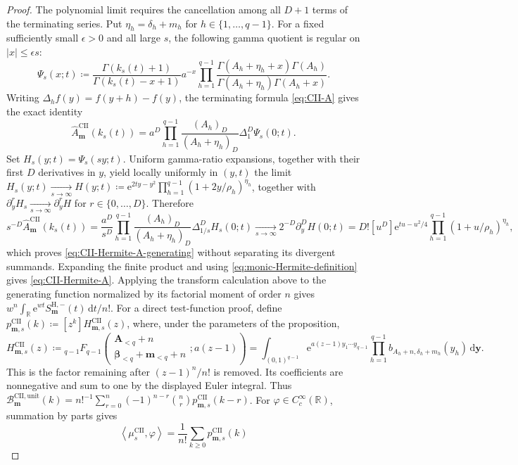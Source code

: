 \documentclass[10pt]{amsart}
\newcommand{\R}{\mathbb R}
\newcommand{\e}{\mathrm e}
\newcommand{\dd}{\,\mathrm d}
\newcommand{\A}{\boldsymbol A}
\newcommand{\bbeta}{\boldsymbol\beta}
\newcommand{\mm}{\boldsymbol m}
\newcommand{\abs}[1]{\lvert#1\rvert}
\newcommand{\pFq}[5]{{}_{#1}F_{#2}\!\left(\begin{matrix}#3\\#4\end{matrix};#5\right)}
\theoremstyle{plain}
\theoremstyle{definition}
\theoremstyle{remark}
\begin{document}
\begin{proof}
The polynomial limit requires the cancellation among all \(D+1\) terms of
the terminating series. Put \(\eta_h=\delta_h+m_h\) for
\(h\in\{1,\ldots,q-1\}\). For a fixed
sufficiently small \(\epsilon>0\) and all large \(s\), the following gamma
quotient is regular on \(\abs{x}\le\epsilon s\):
\[
 \Psi_s(x;t)
 \coloneq\frac{\Gamma(k_s(t)+1)}{\Gamma(k_s(t)-x+1)}a^{-x}
 \prod_{h=1}^{q-1}
 \frac{\Gamma(A_h+\eta_h+x)\Gamma(A_h)}
 {\Gamma(A_h+\eta_h)\Gamma(A_h+x)}.
\]
Writing \(\Delta_hf(y)=f(y+h)-f(y)\), the terminating formula
\eqref{eq:CII-A} gives the exact identity
\[
 \widehat A_{\mm}^{\mathrm{CII}}(k_s(t))
 =a^D\prod_{h=1}^{q-1}\frac{(A_h)_D}{(A_h+\eta_h)_D}
 \Delta_1^D\Psi_s(0;t).
\]
Set \(H_s(y;t)=\Psi_s(sy;t)\). Uniform gamma-ratio expansions, together
with their first \(D\) derivatives in \(y\), yield locally uniformly in
\((y,t)\) the limit
\(H_s(y;t)\xrightarrow[s\to\infty]{}
H(y;t)\coloneq\e^{2ty-y^2}
\prod_{h=1}^{q-1}(1+2y/\rho_h)^{\eta_h}\),
together with
\(\partial_y^rH_s\xrightarrow[s\to\infty]{}\partial_y^rH\) for
\(r\in\{0,\ldots,D\}\). Therefore
\begin{equation*}
	 s^{-D}\widehat A_{\mm}^{\mathrm{CII}}(k_s(t))
 =\frac{a^D}{s^D}
 \prod_{h=1}^{q-1}\frac{(A_h)_D}{(A_h+\eta_h)_D}
 \Delta_{1/s}^DH_s(0;t)
 \xrightarrow[s\to\infty]{}2^{-D}\partial_y^DH(0;t)
 =D![u^D]\e^{tu-u^2/4}
 \prod_{h=1}^{q-1}(1+u/\rho_h)^{\eta_h},
\end{equation*}
which proves \eqref{eq:CII-Hermite-A-generating} without separating its
divergent summands. Expanding the finite product and using
\eqref{eq:monic-Hermite-definition} gives \eqref{eq:CII-Hermite-A}.
Applying the transform calculation above to the generating
function normalized by its factorial moment of order \(n\) gives
\(w^n\int_{\R}\e^{wt}S_{\mm}^{\mathrm H,-}(t)\dd t/n!\).
For a direct test-function proof, define
\(p_{\mm,s}^{\mathrm{CII}}(k)\coloneq[z^k]H_{\mm,s}^{\mathrm{CII}}(z)\),
where, under the parameters of the proposition,
\[
 H_{\mm,s}^{\mathrm{CII}}(z)
 \coloneq\pFq{q-1}{q-1}
 {\A_{<q}+n}{\bbeta_{<q}+\mm_{<q}+n}{a(z-1)}
 =\int_{(0,1)^{q-1}}\e^{a(z-1)y_1\cdots y_{q-1}}
 \prod_{h=1}^{q-1}b_{A_h+n,\delta_h+m_h}(y_h)\dd\boldsymbol y.
\]
This is the factor remaining after \((z-1)^n/n!\) is removed. Its
coefficients are nonnegative and sum to one by the displayed Euler
integral. Thus
\(\mathcal B_{\mm}^{\mathrm{CII,unit}}(k)
=n!^{-1}\sum_{r=0}^n(-1)^{n-r}\binom nr
p_{\mm,s}^{\mathrm{CII}}(k-r)\).
For \(\varphi\in C_c^\infty(\R)\), summation by parts gives
\[
 \left\langle\mu_s^{\mathrm{CII}},\varphi\right\rangle
 =\frac1{n!}\sum_{k\ge0}p_{\mm,s}^{\mathrm{CII}}(k)
\]
\end{proof}
\end{document}

